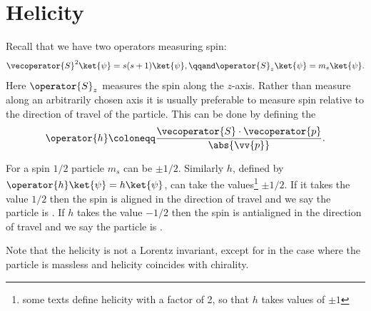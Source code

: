 \documentclass[fleqn]{NotesClass}
\begin{document}
    \section{Helicity}
    Recall that we have two operators measuring spin:
    \begin{equation}
        \vecoperator{S}^2\ket{\psi} = s(s + 1)\ket{\psi}, \qqand \operator{S}_z\ket{\psi} = m_s\ket{\psi}.
    \end{equation}
    Here \(\operator{S}_z\) measures the spin along the \(z\)-axis.
    Rather than measure along an arbitrarily chosen axis it is usually preferable to measure spin relative to the direction of travel of the particle.
    This can be done by defining the 
    \begin{equation}
        \operator{h} \coloneqq \frac{\vecoperator{S} \cdot \vecoperator{p}}{\abs{\vv{p}}}.
    \end{equation}
    
    For a spin \(1/2\) particle \(m_s\) can be \(\pm 1/2\).
    Similarly \(h\), defined by \(\operator{h}\ket{\psi} = h\ket{\psi}\), can take the values\footnote{some texts define helicity with a factor of 2, so that \(h\) takes values of \(\pm 1\)} \(\pm 1/2\).
    If it takes the value \(1/2\) then the spin is aligned in the direction of travel and we say the particle is .
    If \(h\) takes the value \(-1/2\) then the spin is antialigned in the direction of travel and we say the particle is .
    
    Note that the helicity is not a Lorentz invariant, except for in the case where the particle is massless and helicity coincides with chirality.
    
\end{document}
